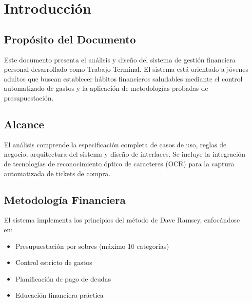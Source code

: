 \chapter{Introducción}

\section{Propósito del Documento}

Este documento presenta el análisis y diseño del sistema de gestión financiera personal desarrollado como Trabajo Terminal. El sistema está orientado a jóvenes adultos que buscan establecer hábitos financieros saludables mediante el control automatizado de gastos y la aplicación de metodologías probadas de presupuestación.

\section{Alcance}

El análisis comprende la especificación completa de casos de uso, reglas de negocio, arquitectura del sistema y diseño de interfaces. Se incluye la integración de tecnologías de reconocimiento óptico de caracteres (OCR) para la captura automatizada de tickets de compra.

\section{Metodología Financiera}

El sistema implementa los principios del método de Dave Ramsey, enfocándose en:
\begin{itemize}
    \item Presupuestación por sobres (máximo 10 categorías)
    \item Control estricto de gastos
    \item Planificación de pago de deudas
    \item Educación financiera práctica
\end{itemize}